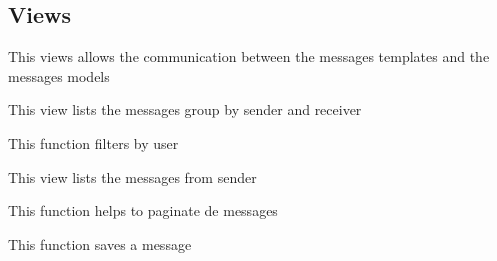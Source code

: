 \documentclass[letterpaper,10pt,english]{sphinxmanual}
\begin{document}
\subsection{Views}
\label{modules/messages:views}
This views allows the communication between the messages templates and the messages models
\label{modules/messages:module-apps.message.views}

\begin{fulllineitems}
\label{modules/messages:apps.message.views.ConversationsList}
This view lists the messages group by sender and receiver

\begin{fulllineitems}
\label{modules/messages:apps.message.views.ConversationsList.get_queryset}
This function filters by user

\end{fulllineitems}


\end{fulllineitems}


\begin{fulllineitems}
\label{modules/messages:apps.message.views.MessagesList}
This view lists the messages from sender

\begin{fulllineitems}
\label{modules/messages:apps.message.views.MessagesList.get_context_data}
This function helps to paginate de messages

\end{fulllineitems}


\begin{fulllineitems}
\label{modules/messages:apps.message.views.MessagesList.post}
This function saves a message

\end{fulllineitems}


\end{fulllineitems}
\end{document}
